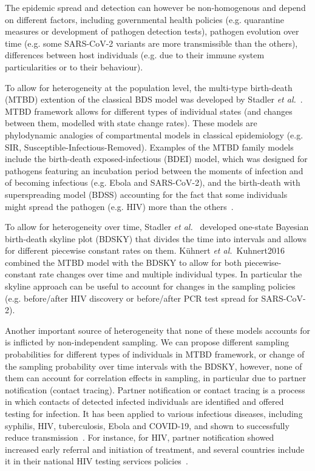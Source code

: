 \documentclass[10pt,letterpaper]{article}
\begin{document}
The epidemic spread and detection can however be non-homogenous and depend on different factors, including governmental health policies (e.g. quarantine measures or development of pathogen detection tests), pathogen evolution over time (e.g. some SARS-CoV-2 variants are more transmissible than the others),  differences between host individuals (e.g. due to their immune system particularities or to their behaviour).

To allow for heterogeneity at the population level, the multi-type birth-death (MTBD) extention of the classical BDS model was developed by Stadler \textit{et al.}~\cite{Stadler2013a}. MTBD framework allows for different types of individual states (and changes between them, modelled with state change rates). These models are phylodynamic analogies of compartmental models in classical epidemiology (e.g. SIR, Susceptible-Infectious-Removed).  Examples of the MTBD family models include the birth-death exposed-infectious (BDEI) model, which was designed for pathogens featuring an incubation period between the moments of infection and of becoming infectious (e.g. Ebola and SARS-CoV-2), and the birth-death with superspreading model (BDSS) accounting for the fact that some individuals might spread the pathogen (e.g. HIV) more than the others~\cite{Stadler2014}.

To allow for heterogeneity over time, Stadler \textit{et al.}~\cite{Stadler2013} developed one-state Bayesian birth-death skyline plot (BDSKY) that divides the time into intervals and allows for different piecewise constant rates on them. Kühnert \textit{et al.}~{Kuhnert2016} combined the MTBD model with the BDSKY to allow for both piecewise-constant rate changes over time and multiple individual types. In particular the skyline approach can be useful to account for changes in the sampling policies (e.g. before/after HIV discovery or before/after PCR test spread for SARS-CoV-2).


Another important source of heterogeneity that none of these models accounts for is inflicted by non-independent sampling. We can propose different sampling probabilities for different types of individuals in MTBD framework, or change of the sampling probability over time intervals with the BDSKY, however, none of them can account for correlation effects in sampling, in particular due to partner notification (contact tracing). Partner notification or contact tracing is a process in which contacts of detected infected individuals are identified and offered testing for infection. It has been applied to various infectious diseases, including syphilis, HIV, tuberculosis, Ebola and COVID-19, and shown to successfully reduce transmission~\cite{el-sadrContactTracingBarriers2022}. For instance, for HIV,  partner notification showed increased early referral and initiation of treatment, and several countries include it in their national HIV testing services policies~\cite{worldhealthorganizationCountryPolicyReview2016}. 
\end{document}
